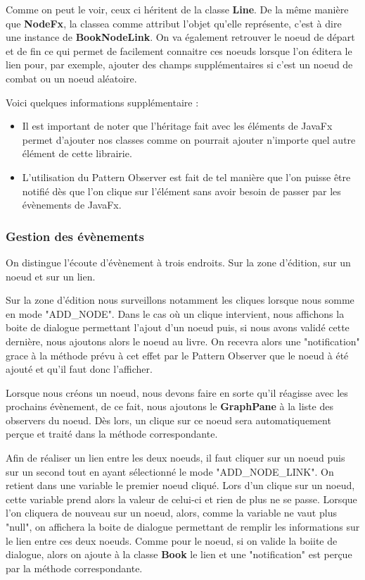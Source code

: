 				Comme on peut le voir, ceux ci héritent de la classe \textbf{Line}. De la même manière que \textbf{NodeFx}, la classea comme attribut l'objet qu'elle représente, c'est à dire une instance de \textbf{BookNodeLink}. On va également retrouver le noeud de départ et de fin ce qui permet de facilement connaitre ces noeuds lorsque l'on éditera le lien pour, par exemple, ajouter des champs supplémentaires si c'est un noeud de combat ou un noeud aléatoire.

				Voici quelques informations supplémentaire :

				\begin{itemize}
					\item{Il est important de noter que l'héritage fait avec les éléments de JavaFx permet d'ajouter nos classes comme on pourrait ajouter n'importe quel autre élément de cette librairie.}
					\item{L'utilisation du Pattern Observer est fait de tel manière que l'on puisse être notifié dès que l'on clique sur l'élément sans avoir besoin de passer par les évènements de JavaFx.}
				\end{itemize}

			\subsubsection{Gestion des évènements}

				On distingue l'écoute d'évènement à trois endroits. Sur la zone d'édition, sur un noeud et sur un lien.

				Sur la zone d'édition nous surveillons notamment les cliques lorsque nous somme en mode "ADD\_NODE". Dans le cas où un clique intervient, nous affichons la boite de dialogue permettant l'ajout d'un noeud puis, si nous avons validé cette dernière, nous ajoutons alors le noeud au livre. On recevra alors une "notification" grace à la méthode prévu à cet effet par le Pattern Observer que le noeud à été ajouté et qu'il faut donc l'afficher.

				Lorsque nous créons un noeud, nous devons faire en sorte qu'il réagisse avec les prochains évènement, de ce fait, nous ajoutons le \textbf{GraphPane} à la liste des observers du noeud. Dès lors, un clique sur ce noeud sera automatiquement perçue et traité dans la méthode correspondante.

				Afin de réaliser un lien entre les deux noeuds, il faut cliquer sur un noeud puis sur un second tout en ayant sélectionné le mode "ADD\_NODE\_LINK". On retient dans une variable le premier noeud cliqué. Lors d'un clique sur un noeud, cette variable prend alors la valeur de celui-ci et rien de plus ne se passe. Lorsque l'on cliquera de nouveau sur un noeud, alors, comme la variable ne vaut plus "null", on affichera la boite de dialogue permettant de remplir les informations sur le lien entre ces deux noeuds. Comme pour le noeud, si on valide la boiite de dialogue, alors on ajoute à la classe \textbf{Book} le lien et une "notification" est perçue par la méthode correspondante.

